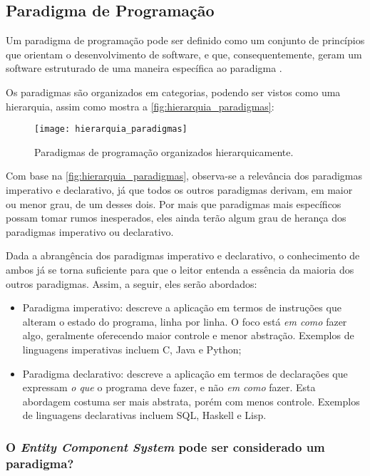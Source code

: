 \subsection{Paradigma de Programação}

Um paradigma de programação pode ser definido como um conjunto de princípios que orientam o desenvolvimento de software, e que, consequentemente, geram um software estruturado de uma maneira específica ao paradigma \cite{paradigmsfordummies}.

Os paradigmas são organizados em categorias, podendo ser vistos como uma hierarquia, assim como mostra a \autoref{fig:hierarquia_paradigmas}:

\begin{figure}[H]
	\centering
	\texttt{[image: hierarquia\_paradigmas]}
	\caption{Paradigmas de programação organizados hierarquicamente.}
	\label{fig:hierarquia_paradigmas}
\end{figure}

Com base na \autoref{fig:hierarquia_paradigmas}, observa-se a relevância dos paradigmas imperativo e declarativo, já que todos os outros paradigmas derivam, em maior ou menor grau, de um desses dois. Por mais que paradigmas mais específicos possam tomar rumos inesperados, eles ainda terão algum grau de herança dos paradigmas imperativo ou declarativo.

Dada a abrangência dos paradigmas imperativo e declarativo, o conhecimento de ambos já se torna suficiente para que o leitor entenda a essência da maioria dos outros paradigmas. Assim, a seguir, eles serão abordados:

\begin{itemize}
	\item Paradigma imperativo: descreve a aplicação em termos de instruções que alteram o estado do programa, linha por linha. O foco está \textit{em como} fazer algo, geralmente oferecendo maior controle e menor abstração. Exemplos de linguagens imperativas incluem C, Java e Python;
	\item Paradigma declarativo: descreve a aplicação em termos de declarações que expressam \textit{o que} o programa deve fazer, e não \textit{em como} fazer. Esta abordagem costuma ser mais abstrata, porém com menos controle. Exemplos de linguagens declarativas incluem SQL, Haskell e Lisp.
\end{itemize}

\subsubsection{O \textit{Entity Component System} pode ser considerado um paradigma?}

